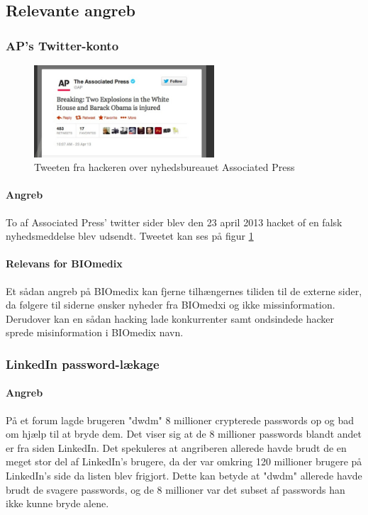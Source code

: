 \documentclass{article}
\begin{document}
\subsection{Relevante angreb}

\subsubsection{AP's Twitter-konto}

\begin{figure}
  \begin{center}
    \includegraphics[width=0.6\textwidth]{../Pictures/APTweet.jpg}
  \end{center}
  \caption{Tweeten fra hackeren over nyhedsbureauet Associated Press \cite{APTweetSource}}
  \label{fig:Tweet}
\end{figure}

\paragraph{Angreb}

To af Associated Press' twitter sider blev den 23 april 2013 hacket of en falsk nyhedsmeddelse blev udsendt\cite{TweetStory}. Tweetet kan ses på figur \ref{fig:Tweet}

\paragraph{Relevans for BIOmedix}

Et sådan angreb på BIOmedix kan fjerne tilhængernes tiliden til de externe sider, da følgere til siderne
ønsker nyheder fra BIOmedxi og ikke missinformation. Derudover kan en sådan hacking lade konkurrenter
samt ondsindede hacker sprede misinformation i BIOmedix navn. 

\subsubsection{LinkedIn password-lækage}

\paragraph{Angreb}
På et forum lagde brugeren "dwdm" 8 millioner crypterede passwords op og bad om hjælp
til at bryde dem. Det viser sig at de 8 millioner passwords blandt andet er fra siden LinkedIn.
Det spekuleres at angriberen allerede havde brudt de en meget stor del af LinkedIn's brugere, da
der var omkring 120 millioner brugere på LinkedIn's side da listen blev frigjort. Dette kan betyde
at "dwdm" allerede havde brudt de svagere passwords, og de 8 millioner var det subset af passwords
han ikke kunne bryde alene\cite{LinkedInStory}.
\end{document}
